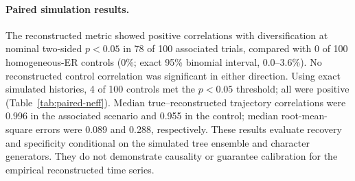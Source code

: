\paragraph{Paired simulation results.}
The reconstructed metric showed positive correlations with diversification
at nominal two-sided $p<0.05$ in 78 of 100 associated trials, compared with
0 of 100 homogeneous-ER controls
(0\%; exact 95\% binomial interval,
0.0--3.6\%).
No reconstructed control correlation was significant in either direction.
Using exact simulated histories, 4 of 100 controls met the
$p<0.05$ threshold; all were positive (Table~\ref{tab:paired-neff}).
Median true--reconstructed trajectory correlations were 0.996 in the
associated scenario and 0.955 in the control; median
root-mean-square errors were 0.089 and 0.288, respectively.
These results evaluate recovery and specificity conditional on the simulated
tree ensemble and character generators. They do not demonstrate causality
or guarantee calibration for the empirical reconstructed time series.
